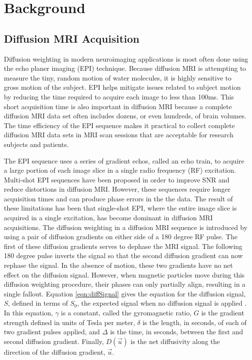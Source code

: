 \chapter{Background}
\section{Diffusion MRI Acquisition}
	Diffusion weighting in modern neuroimaging applications is most often done using the echo planer imaging (EPI) technique\cite{Poustchi_Amin_2001,Ordidge_1984}. Because diffusion MRI is attempting to measure the tiny, random motion of water molecules, it is highly sensitive to gross motion of the subject. EPI helps mitigate issues related to subject motion by reducing the time required to acquire each image to less than 100ms. This short acquisition time is also important in diffusion MRI because a complete diffusion MRI data set often includes dozens, or even hundreds, of brain volumes. The time efficiency of the EPI sequence makes it practical to collect complete diffusion MRI data sets in MRI scan sessions that are acceptable for research subjects and patients.
	
    The EPI sequence uses a series of gradient echos, called an echo train, to acquire a large portion of each image slice in a single radio frequency (RF) excitation. Multi-shot EPI sequences have been proposed in order to improve SNR and reduce distortions in diffusion MRI. However, these sequences require longer acquisition times and can produce phase errors in the the data\cite{Feinberg_1994}. The result of these limitations has been that single-shot EPI, where the entire image slice is acquired in a single excitation, has become dominant in diffusion MRI acquisitions. The diffusion weighting in a diffusion MRI sequence is introduced by using a pair of diffusion gradients on either side of a 180 degree RF pulse. The first of these diffusion gradients serves to dephase the MRI signal. The following 180 degree pulse inverts the signal so that the second diffusion gradient can now rephase the signal. In the absence of motion, these two gradients have no net effect on the diffusion signal. However, when magnetic particles move during this diffusion weighting procedure, their phases can only partially align, resulting in a single fallout. Equation \ref{eqn:diffSignal} gives the equation for the diffusion signal, $S$, defined in terms of $S_0$, the expected signal when no diffusion signal is applied \cite{2014}. In this equation, $\gamma$ is a constant, called the gyromagnetic ratio, $G$ is the gradient strength defined in units of Tesla per meter, $\delta$ is the length, in seconds, of each of two gradient pulses applied, and $\Delta$ is the time, in seconds, between the first and second diffusion gradient. Finally, $D(\vec{u})$ is the net diffusivity along the direction of the diffusion gradient, $\vec{u}$.

